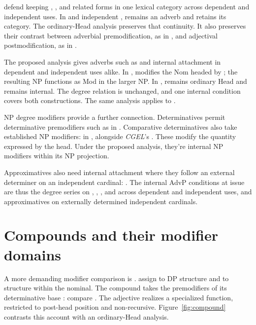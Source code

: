 \documentclass[12pt]{article}
\begin{document}
\textcite[40--42]{payne2010} defend keeping , , and related forms in one lexical category across dependent and independent uses. In  and independent ,  remains an adverb and  retains its category. The ordinary-Head analysis preserves that continuity. It also preserves their contrast between adverbial premodification, as in , and adjectival postmodification, as in  \citep[41--42]{payne2010}.

The proposed analysis gives adverbs such as  and  internal attachment in dependent and independent uses alike. In ,  modifies the Nom headed by ; the resulting  NP functions as Mod in the larger NP. In ,  remains ordinary Head and  remains internal. The degree relation is unchanged, and one internal condition covers both constructions. The same analysis applies to .

NP degree modifiers provide a further connection. Determinatives permit determinative premodifiers such as  in  \citep[393]{huddleston2002}. Comparative determinatives also take established NP modifiers:  in , alongside \textit{CGEL}'s  \citep[432]{huddleston2002}. These modify the quantity expressed by the head. Under the proposed analysis, they're internal NP modifiers within its NP projection.

Approximatives also need internal attachment where they follow an external determiner on an independent cardinal: . The internal AdvP conditions at issue are thus the degree series on , , , and  across dependent and independent uses, and approximatives on externally determined independent cardinals.

\section{Compounds and their modifier domains}\label{sec:compounds}

A more demanding modifier comparison is . \textcite[581--583]{Payne2007} assign  to DP structure and  to structure within the nominal. The compound  takes the premodifiers of its determinative base : compare . The adjective realizes a specialized  function, restricted to post-head position and non-recursive. Figure~\ref{fig:compound} contrasts this account with an ordinary-Head analysis.
\end{document}
